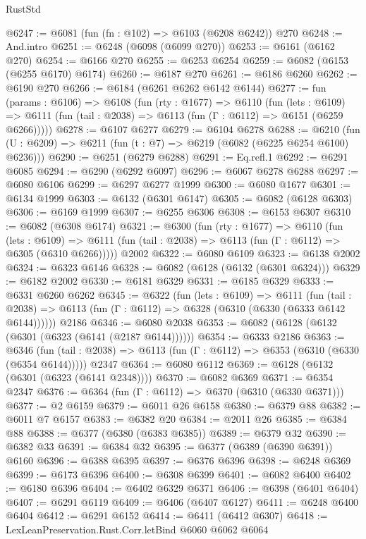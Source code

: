 \begin{lexlean}{RustStd}
\begin{coremodule}
@6247 := @6081 (fun (fn : @102) => @6103 (@6208 @6242)) @270
@6248 := And.intro
@6251 := @6248 (@6098 (@6099 @270))
@6253 := @6161 (@6162 @270)
@6254 := @6166 @270
@6255 := @6253 @6254
@6259 := @6082 (@6153 (@6255 @6170) @6174)
@6260 := @6187 @270
@6261 := @6186 @6260
@6262 := @6190 @270
@6266 := @6184 (@6261 @6262 @6142 @6144)
@6277 := fun (params : @6106) =>
  @6108
    (fun (rty : @1677) =>
    @6110
      (fun (lets : @6109) =>
      @6111 (fun (tail : @2038) => @6113 (fun (Γ : @6112) => @6151 (@6259 @6266)))))
@6278 := @6107 @6277
@6279 := @6104 @6278
@6288 := @6210 (fun (U : @6209) => @6211 (fun (t : @7) => @6219 (@6082 (@6225 @6254 @6100) @6236)))
@6290 := @6251 (@6279 @6288)
@6291 := Eq.refl.{1}
@6292 := @6291 @6085
@6294 := @6290 (@6292 @6097)
@6296 := @6067 @6278 @6288
@6297 := @6080 @6106
@6299 := @6297 @6277 @1999
@6300 := @6080 @1677
@6301 := @6134 @1999
@6303 := @6132 (@6301 @6147)
@6305 := @6082 (@6128 @6303)
@6306 := @6169 @1999
@6307 := @6255 @6306
@6308 := @6153 @6307
@6310 := @6082 (@6308 @6174)
@6321 := @6300
    (fun (rty : @1677) =>
    @6110
      (fun (lets : @6109) =>
      @6111 (fun (tail : @2038) => @6113 (fun (Γ : @6112) => @6305 (@6310 @6266)))))
    @2002
@6322 := @6080 @6109
@6323 := @6138 @2002
@6324 := @6323 @6146
@6328 := @6082 (@6128 (@6132 (@6301 @6324)))
@6329 := @6182 @2002
@6330 := @6181 @6329
@6331 := @6185 @6329
@6333 := @6331 @6260 @6262
@6345 := @6322
    (fun (lets : @6109) =>
    @6111
      (fun (tail : @2038) => @6113 (fun (Γ : @6112) => @6328 (@6310 (@6330 (@6333 @6142 @6144))))))
    @2186
@6346 := @6080 @2038
@6353 := @6082 (@6128 (@6132 (@6301 (@6323 (@6141 (@2187 @6144))))))
@6354 := @6333 @2186
@6363 := @6346
    (fun (tail : @2038) => @6113 (fun (Γ : @6112) => @6353 (@6310 (@6330 (@6354 @6144)))))
    @2347
@6364 := @6080 @6112
@6369 := @6128 (@6132 (@6301 (@6323 (@6141 @2348))))
@6370 := @6082 @6369
@6371 := @6354 @2347
@6376 := @6364 (fun (Γ : @6112) => @6370 (@6310 (@6330 @6371)))
@6377 := @2 @6159
@6379 := @6011 @26 @6158
@6380 := @6379 @88
@6382 := @6011 @7 @6157
@6383 := @6382 @20
@6384 := @2011 @26
@6385 := @6384 @88
@6388 := @6377 (@6380 (@6383 @6385))
@6389 := @6379 @32
@6390 := @6382 @33
@6391 := @6384 @32
@6395 := @6377 (@6389 (@6390 @6391)) @6160
@6396 := @6388 @6395
@6397 := @6376 @6396
@6398 := @6248 @6369
@6399 := @6173 @6396
@6400 := @6308 @6399
@6401 := @6082 @6400
@6402 := @6180 @6396
@6404 := @6402 @6329 @6371
@6406 := @6398 (@6401 @6404)
@6407 := @6291 @6119
@6409 := @6406 (@6407 @6127)
@6411 := @6248 @6400 @6404
@6412 := @6291 @6152
@6414 := @6411 (@6412 @6307)
@6418 := LexLeanPreservation.Rust.Corr.letBind @6060 @6062 @6064

\end{coremodule}
\end{lexlean}
